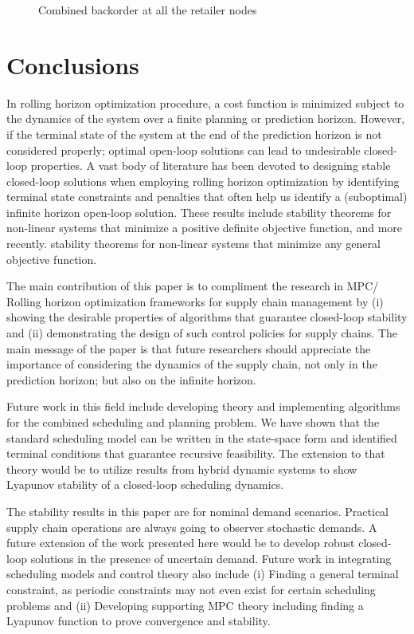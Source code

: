 \documentclass[10pt]{article}
\theoremstyle{definition}
\begin{document}
\begin{figure}
\centering
\scriptsize
\resizebox{1\textwidth}{!}{}
\caption{Combined backorder at all the retailer nodes}
\label{fig:BO_TNT}
\end{figure}





\section{Conclusions}
\label{sec:conclusions}
In rolling horizon optimization procedure, a cost function is
minimized subject to the dynamics of the system over a finite planning
or prediction horizon. However, if the terminal state of the system at
the end of the prediction horizon is not considered properly; optimal
open-loop solutions can lead to undesirable closed-loop properties. A
vast body of literature has been devoted to designing stable
closed-loop solutions when employing rolling horizon optimization by
identifying terminal state constraints and penalties that often help
us identify a (suboptimal) infinite horizon open-loop solution. These
results include stability theorems for non-linear systems
that minimize a positive definite objective function, and more
recently. stability theorems for  non-linear systems that minimize any
general objective function. 

The main contribution of this paper is to compliment the research in
MPC/ Rolling horizon optimization frameworks for supply chain
management by (i) showing the desirable properties of algorithms that
guarantee closed-loop stability and (ii) demonstrating the design of
such control policies for supply chains.  The main message of the paper  is
that future researchers should appreciate the importance of considering the dynamics of the supply
chain, not only in the prediction horizon; but also on the infinite
horizon.

Future work in this field include developing
theory and implementing algorithms for the combined scheduling and
planning problem. We have shown that the standard
scheduling model can be written in the state-space form and identified
terminal conditions that guarantee recursive feasibility. The extension to that
theory would be to utilize results from hybrid dynamic systems to show
Lyapunov stability of a closed-loop scheduling dynamics. 

The stability results in this paper are for nominal demand
scenarios. Practical supply chain operations are always going to
observer stochastic demands. A future extension of the work presented
here would be to develop robust closed-loop solutions in the presence
of uncertain demand. Future work in integrating scheduling models and control
theory also include (i) Finding a general terminal constraint, as
periodic constraints may not even exist for certain scheduling
problems and (ii) Developing supporting MPC theory  including finding
a Lyapunov function to prove convergence and stability.


{}
\end{document}
